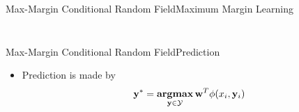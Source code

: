 \documentclass[first=dgreen,second=purple,logo=yellowexc]{aaltoslides}
\newcommand{\argmax}{\textbf{argmax}}
\newcommand{\yb}{{\bf y}}
\newcommand{\wb}{{\bf w}}
\begin{document}
\begin{frame}{Max-Margin Conditional Random Field}{Maximum Margin Learning}
\begin{itemize}
\begin{columns}
\begin{column}{.3\linewidth}
\begin{figure}
        \end{figure}
        \end{column}
    \end{columns}
\end{itemize}
\end{frame}

\begin{frame}{Max-Margin Conditional Random Field}{Prediction}
\begin{itemize}
    \item Prediction is made by
    \begin{align*}
        \yb^* = \underset{\yb\in\mathcal{Y}}{\argmax} \, \wb^T\phi(x_i,\yb_i)
    \end{align*}
\end{itemize}
\end{frame}






\end{document}
